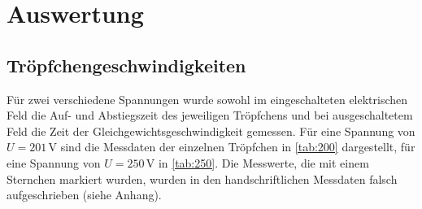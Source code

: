 \section{Auswertung}
\label{sec:Auswertung}




\subsection{Tröpfchengeschwindigkeiten}
Für zwei verschiedene Spannungen wurde sowohl im eingeschalteten elektrischen Feld die Auf- und Abstiegszeit des jeweiligen Tröpfchens und bei ausgeschaltetem 
Feld die Zeit der Gleichgewichtsgeschwindigkeit gemessen. Für eine Spannung von $U = 201\,\unit{\volt}$ sind die Messdaten der einzelnen 
Tröpfchen in \autoref{tab:200} dargestellt, für eine Spannung von $U = 250\,\unit{\volt}$ in \autoref{tab:250}. Die Messwerte, die mit einem 
Sternchen markiert wurden, wurden in den handschriftlichen Messdaten falsch aufgeschrieben (siehe Anhang).

